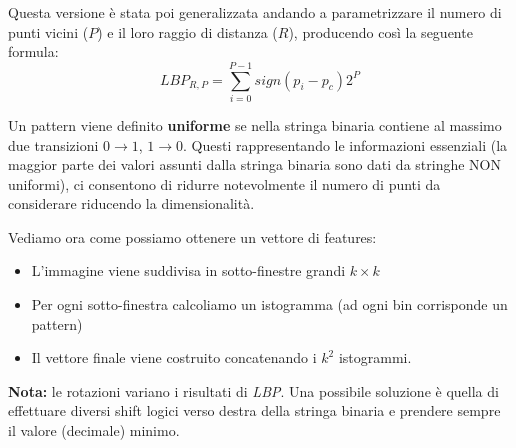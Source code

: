 \documentclass{article}
\begin{document}
\bigskip
Questa versione è stata poi generalizzata andando a parametrizzare il numero di punti vicini ($P$) e il loro raggio di distanza ($R$), producendo così la seguente formula:
$$LBP_{R,P} = \sum_{i=0}^{P-1} sign(p_i - p_c)2^P$$

Un pattern viene definito \textbf{uniforme} se nella stringa binaria contiene al massimo due transizioni $0 \rightarrow 1$, $1 \rightarrow 0$. Questi rappresentando le informazioni essenziali (la maggior parte dei valori assunti dalla stringa binaria sono dati da stringhe NON uniformi), ci consentono di ridurre notevolmente il numero di punti da considerare riducendo la dimensionalità.

\bigskip
Vediamo ora come possiamo ottenere un vettore di features:
\begin{itemize}
    \item L'immagine viene suddivisa in sotto-finestre grandi $k\times k$
    \item Per ogni sotto-finestra calcoliamo un istogramma (ad ogni bin corrisponde un pattern)
    \item Il vettore finale viene costruito concatenando i $k^2$ istogrammi.
\end{itemize}

\textbf{Nota:} le rotazioni variano i risultati di \textit{LBP}. Una possibile soluzione è quella di effettuare diversi shift logici verso destra della stringa binaria e prendere sempre il valore (decimale) minimo.
\end{document}
